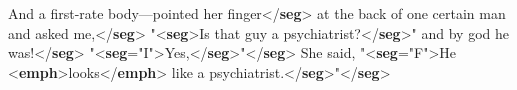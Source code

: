 \begin{shaded}
\mbox{}\newline 
{}\mbox{}\newline 
\hspace*{1em}And a first-rate body—pointed her finger{</\textbf{seg}>}\mbox{}\newline 
{}\mbox{}\newline 
{}\mbox{}\newline 
\hspace*{1em}at the back of one certain man and asked me,{</\textbf{seg}>}\mbox{}\newline 
{}\mbox{}\newline 
{}\mbox{}\newline 
\hspace*{1em}"{<\textbf{seg}>}Is that guy a psychiatrist?{</\textbf{seg}>}" and by god he was!{</\textbf{seg}>}\mbox{}\newline 
\hspace*{1em}"{<\textbf{seg}\hspace*{1em}{part}="{I}">}Yes,{</\textbf{seg}>}"{</\textbf{seg}>}\mbox{}\newline 
{}\mbox{}\newline 
{}\mbox{}\newline 
\hspace*{1em}She said, "{<\textbf{seg}\hspace*{1em}{part}="{F}">}He {<\textbf{emph}>}looks{</\textbf{emph}>} like a psychiatrist.{</\textbf{seg}>}"{</\textbf{seg}>}\mbox{}\newline 

\end{shaded}
